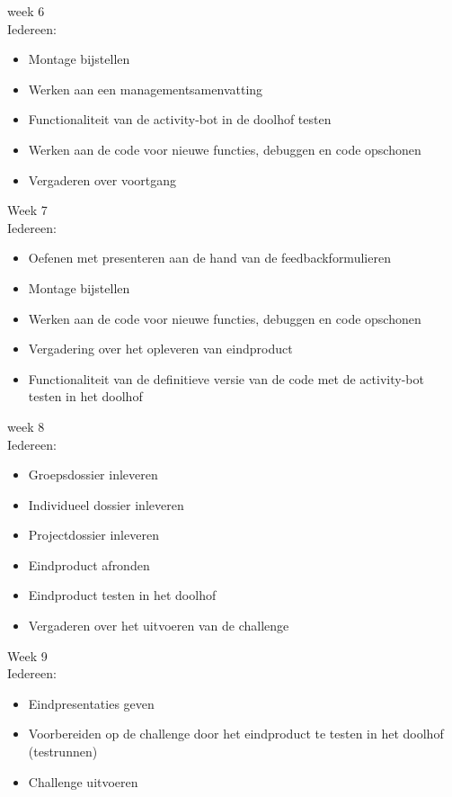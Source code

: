 \documentclass[oneside]{book}
\begin{document}
week 6\\
Iedereen:\\
\begin{itemize}
\item Montage bijstellen
\item Werken aan een managementsamenvatting
\item Functionaliteit van de activity-bot in de doolhof testen
\item Werken aan de code voor nieuwe functies, debuggen en code opschonen
\item Vergaderen over voortgang 
\end{itemize}

Week 7\\
Iedereen:\\
\begin{itemize}
\item Oefenen met presenteren aan de hand van de feedbackformulieren
\item Montage bijstellen
\item Werken aan de code voor nieuwe functies, debuggen en code opschonen
\item Vergadering over het opleveren van eindproduct 
\item Functionaliteit van de definitieve versie van de code met de activity-bot testen in het doolhof
\end{itemize}

week 8\\
Iedereen:\\
\begin{itemize}
\item Groepsdossier inleveren
\item Individueel dossier inleveren
\item Projectdossier inleveren
\item Eindproduct afronden
\item Eindproduct testen in het doolhof
\item Vergaderen over het uitvoeren van de challenge
\end{itemize}

Week 9\\
Iedereen:\\
\begin{itemize}
\item Eindpresentaties geven
\item Voorbereiden op de challenge door het eindproduct te testen in het doolhof (testrunnen)
\item Challenge uitvoeren
\end{itemize}
\end{document}

